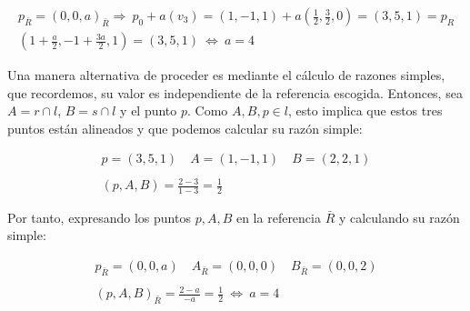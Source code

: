  \begin{gather*}
     p_{\bar{R}} = (0, 0, a)_{\bar{R}} \Longrightarrow \ p_0 + a(v_3) = (1, -1, 1) + a(\frac{1}{2}, \frac{3}{2}, 0) = (3, 5, 1) = p_R \\ (1 + \frac{a}{2}, -1 + \frac{3a}{2}, 1) = (3, 5, 1) \ \Longleftrightarrow \ a = 4
 \end{gather*}
 
 Una manera alternativa de proceder es mediante el cálculo de razones simples, que recordemos, su valor es independiente de la referencia escogida. Entonces, sea $A = r \cap l$, $B = s \cap l$ y el punto $p$. Como $A, B, p \in l$, esto implica que estos tres puntos están alineados y que podemos calcular su razón simple:
 
 \begin{gather*}
     p = (3, 5, 1) \quad A = (1, -1, 1) \quad B = (2, 2, 1) \\
     \\
     (p, A, B) = \frac{2 - 3}{1 - 3} = \frac{1}{2}
 \end{gather*}
 
 Por tanto, expresando los puntos $p, A, B$ en la referencia $\bar{R}$ y calculando su razón simple:
 
 \begin{gather*}
     p_{\bar{R}} = (0, 0, a) \quad A_{\bar{R}} = (0, 0, 0) \quad B_{\bar{R}} = (0, 0, 2) \\
     \\
     (p, A, B)_{\bar{R}} = \frac{2 - a}{-a} = \frac{1}{2} \ \Longleftrightarrow \ a = 4
 \end{gather*}
